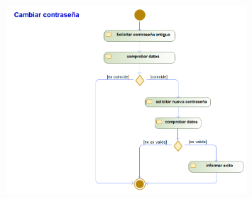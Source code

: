 \begin{figure}[H]
	\centering
	\includegraphics[width=0.8\textwidth]{Use_Cases/cambiar_contrasena.png}
\end{figure}
\newpage
